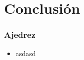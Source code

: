 
\section{Conclusión}

\begin{frame}
\frametitle{Ajedrez}

\begin{itemize}
\item asdasd
\end{itemize}

\end{frame}